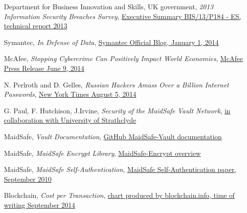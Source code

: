 \documentclass[twocolumn,english]{article}
\begin{document}
\begin{thebibliography}{9}
 Department for Business Innovation and Skills, UK government, \emph{2013 Information Security Breaches Survey}, \href{https://www.gov.uk/government/uploads/system/uploads/attachment_data/file/191671/bis-13-p184es-2013-information-security-breaches-survey-executive-summary.pdf}{Executive Summary BIS/13/P184 - ES, technical report 2013}

 Symantec, \emph{In Defense of Data}, \href{http://www.symantec.com/connect/blogs/data-breach-trends}{Symantec Official Blog, January 1, 2014}

 McAfee, \emph{Stopping Cybercrime Can Positively Impact World Economies}, \href{http://www.mcafee.com/uk/about/news/2014/q2/20140609-01.aspx}{McAfee Press Release June 9, 2014}

 N. Perlroth and D. Gelles, \emph{Russian Hackers Amass Over a Billion Internet Passwords}, \href{http://www.nytimes.com/2014/08/06/technology/russian-gang-said-to-amass-more-than-a-billion-stolen-internet-credentials.html}{New York Times August 5, 2014}

 G. Paul, F. Hutchison, J.Irvine, \emph{Security of the MaidSafe Vault Network}, \href{https://pure.strath.ac.uk/portal/files/34898763/Paul_etal_wwrf32_vault_network.pdf}{in collaboration with University of Strathclyde}

 MaidSafe, \emph{Vault Documentation}, \href{https://github.com/maidsafe/MaidSafe-Vault/wiki/Documentation}{GitHub MaidSafe-Vault documentation}

 MaidSafe, \emph{MaidSafe Encrypt Library}, \href{http://maidsafe.net/libraries-encrypt}{MaidSafe-Encrypt overview}

 MaidSafe, \emph{MaidSafe Self-Authentication}, \href{http://maidsafe.net/Whitepapers/pdf/SelfAuthentication.pdf}{MaidSafe Self-Authentication paper, September 2010}

 Blockchain, \emph{Cost per Transaction}, \href{https://blockchain.info/charts/cost-per-transaction}{chart produced by blockchain.info, time of writing September 2014}

\end{thebibliography}
\end{document}
